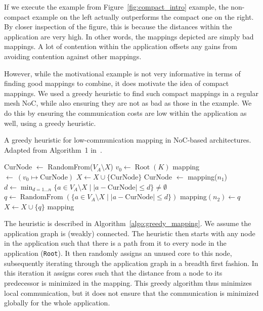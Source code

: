 If we execute the example from Figure~\ref{fig:compact_intro} example, the non-compact example on the left actually outperforms the compact one on the right.
By closer inspection of the figure, this is because the distances within the application are very high.
In other words, the mappings depicted are simply bad mappings.
A lot of contention within the application offsets any gains from avoiding contention against other mappings.

However, while the motivational example is not very informative in terms of finding good mappings to combine, it does motivate the idea of compact mappings.
We used a greedy heuristic to find such compact mappings in a regular mesh \ac{NoC}, while also ensuring they are not as bad as those in the example.
We do this by ensuring the communication costs are low within the application as well, using a greedy heuristic.

\begin{algorithm}
	\caption{A greedy heuristic for low-communication mapping in \ac{NoC}-based architectures. Adapted from Algorithm~1 in~\cite{goens_samos19}.}
	\label{algo:greedy_mapping}
	\begin{algorithmic}[1]
	  \State CurNode $\leftarrow$ RandomFrom($V_A \setminus X$)
	  \State $v_0 \leftarrow \operatorname{Root}(K)$
	  \State mapping $\leftarrow~(v_0 \mapsto \text{CurNode})$
	  \State $X \leftarrow X \cup \{ \text{CurNode} \}$
		  \State CurNode $\leftarrow$ mapping($n_1$)
		  \State $d \leftarrow \min_{d = 1 \ldots n} \{a \in V_A \setminus X \mid |a - \text{CurNode}| \leq d \} \neq \emptyset $
		  \State $q \leftarrow \operatorname{RandomFrom}(\{ a \in V_A \setminus X \mid |a - \text{CurNode}| \leq d  \})$
		  \State mapping$(n_2) \leftarrow q $
		  \State $X \leftarrow X \cup \{q\}$
	  \EndFor 
	  \Return mapping
	\end{algorithmic}
  \end{algorithm}


The heuristic is described in Algorithm~\ref{algo:greedy_mapping}.
We assume the application graph is (weakly) connected.
The heuristic then starts with any node in the application such that there is a path from it to every node in the application (\texttt{Root}).
It then randomly assigns an unused core to this node, subsequently iterating through the application graph in a breadth first fashion.
In this iteration it assigns cores such that the distance from a node to its predecessor is minimized in the mapping.
This greedy algorithm thus minimizes local communication, but it does not ensure that the communication is minimized globally for the whole application.

